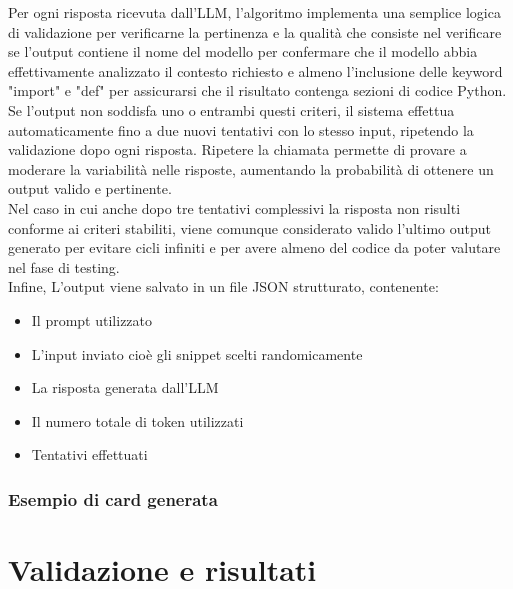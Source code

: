 \documentclass{article}
\begin{document}
\begin{itemize}
Per ogni risposta ricevuta dall'LLM, l'algoritmo implementa una semplice logica di validazione per verificarne la pertinenza e la qualità che consiste nel verificare se l'output contiene il nome del modello per confermare che il modello abbia effettivamente analizzato il contesto richiesto e almeno l'inclusione delle keyword "import" e "def" per assicurarsi che il risultato contenga sezioni di codice Python.\\
Se l'output non soddisfa uno o entrambi questi criteri, il sistema effettua automaticamente fino a due nuovi tentativi con lo stesso input, ripetendo la validazione dopo ogni risposta. Ripetere la chiamata permette di provare a moderare la variabilità nelle risposte, aumentando la probabilità di ottenere un output valido e pertinente.\\ 
Nel caso in cui anche dopo tre tentativi complessivi la risposta non risulti conforme ai criteri stabiliti, viene comunque considerato valido l'ultimo output generato per evitare cicli infiniti e per avere almeno del codice da poter valutare nel fase di testing.\\
Infine, L’output viene salvato in un file JSON strutturato, contenente:  
\begin{itemize}
    \item Il prompt utilizzato
    \item L'input inviato cioè gli snippet scelti randomicamente
    \item La risposta generata dall’LLM
    \item Il numero totale di token utilizzati
    \item Tentativi effettuati
\end{itemize}

\subsubsection{Esempio di card generata}



\end{itemize}

\section{Validazione e risultati}
\end{document}
